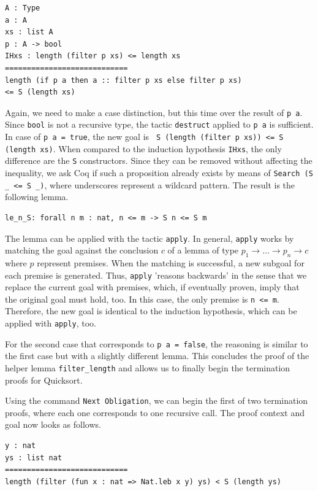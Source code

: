 \documentclass[a4paper, 11pt, fleqn, twoside]{scrreprt}
\newcommand{\cinl}[1]{\texttt{#1}}
\begin{document}
\begin{verbatim}
A : Type
a : A
xs : list A
p : A -> bool
IHxs : length (filter p xs) <= length xs
============================
length (if p a then a :: filter p xs else filter p xs)
<= S (length xs)
\end{verbatim}

Again, we need to make a case distinction, but this time over the result of \cinl{p a}.
Since \cinl{bool} is not a recursive type, the tactic \cinl{destruct} applied to \cinl{p a} is sufficient.
In case of \cinl{p a = true}, the new goal is \cinl{ S (length (filter p xs)) <= S (length xs)}.
When compared to the induction hypothesis \cinl{IHxs}, the only difference are the \cinl{S} constructors.
Since they can be removed without affecting the inequality, we ask Coq if such a proposition already exists by means of \cinl{Search (S _ <= S _)}, where underscores represent a wildcard pattern.
The result is the following lemma.

\begin{verbatim}
le_n_S: forall n m : nat, n <= m -> S n <= S m
\end{verbatim}

The lemma can be applied with the tactic \cinl{apply}.
In general, \cinl{apply} works by matching the goal against the conclusion $c$ of a lemma of type $p_1 \rightarrow \dots \rightarrow p_n \rightarrow c$ where $p$ represent premises.
When the matching is successful, a new subgoal for each premise is generated.
Thus, \cinl{apply} 'reasons backwards' in the sense that we replace the current goal with premises, which, if eventually proven, imply that the original goal must hold, too. 
In this case, the only premise is \cinl{n <= m}.
Therefore, the new goal is identical to the induction hypothesis, which can be applied with \cinl{apply}, too.

For the second case that corresponds to \cinl{p a = false}, the reasoning is similar to the first case but with a slightly different lemma.
This concludes the proof of the helper lemma \cinl{filter_length} and allows us to finally begin the termination proofs for Quicksort.

Using the command \cinl{Next Obligation}, we can begin the first of two termination proofs, where each one corresponds to one recursive call.
The proof context and goal now looks as follows.

\begin{verbatim}
y : nat
ys : list nat
============================
length (filter (fun x : nat => Nat.leb x y) ys) < S (length ys)
\end{verbatim}
\end{document}

